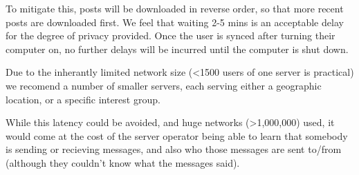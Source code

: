 To mitigate this, posts will be downloaded in reverse order, so that more recent
posts are downloaded first. We feel that waiting 2-5 mins is an acceptable delay
for the degree of privacy provided. Once the user is synced after turning their
computer on, no further delays will be incurred until the computer is shut down.

Due to the inherantly limited network size (\textless1500 users of one server is
practical) we recomend a number of smaller servers, each serving either a
geographic location, or a specific interest group.

While this latency could be avoided, and huge networks (\textgreater1,000,000)
used, it would come at the cost of the server operator being able to learn that
somebody is sending or recieving messages, and also who those messages are sent
to/from (although they couldn't know what the messages said).
